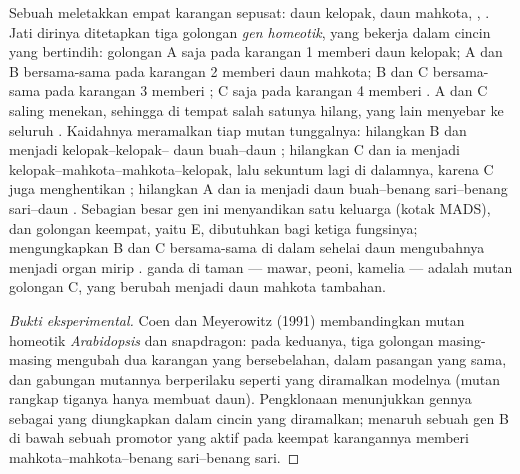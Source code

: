 \begin{proposition}\label{prop:b2:plant-flowering:abc}
Sebuah   meletakkan empat karangan sepusat: daun kelopak,
daun mahkota, , . Jati dirinya ditetapkan tiga
golongan \emph{gen homeotik}, yang bekerja dalam cincin yang bertindih:
golongan A saja pada karangan 1 memberi daun kelopak; A dan B
bersama-sama pada karangan 2 memberi daun mahkota; B dan C bersama-sama
pada karangan 3 memberi ; C saja pada karangan 4 memberi
. A dan C saling menekan, sehingga di tempat salah satunya
hilang, yang lain menyebar ke seluruh . Kaidahnya meramalkan
tiap mutan tunggalnya: hilangkan B dan  menjadi kelopak--kelopak--
daun buah--daun ; hilangkan C dan ia menjadi
kelopak--mahkota--mahkota--kelopak, lalu sekuntum  lagi di
dalamnya, karena C juga menghentikan ; hilangkan A dan ia
menjadi daun buah--benang sari--benang sari--daun . Sebagian besar
gen ini menyandikan  satu keluarga (kotak MADS), dan
golongan keempat, yaitu E, dibutuhkan bagi ketiga fungsinya;
mengungkapkan B dan C bersama-sama di dalam sehelai daun mengubahnya
menjadi organ mirip .  ganda di taman --- mawar, peoni,
kamelia --- adalah mutan golongan C, yang  berubah
menjadi daun mahkota tambahan.
\end{proposition}
\begin{proof}[Bukti eksperimental]
Coen dan Meyerowitz (1991) membandingkan mutan homeotik
\emph{Arabidopsis} dan snapdragon: pada keduanya, tiga golongan 
masing-masing mengubah dua karangan yang bersebelahan, dalam pasangan
yang sama, dan gabungan mutannya berperilaku seperti yang diramalkan
modelnya (mutan rangkap tiganya hanya membuat daun). Pengklonaan
menunjukkan gennya sebagai  yang diungkapkan dalam
cincin yang diramalkan; menaruh sebuah gen B di bawah sebuah promotor
yang aktif pada keempat karangannya memberi
mahkota--mahkota--benang sari--benang sari.
\end{proof}

